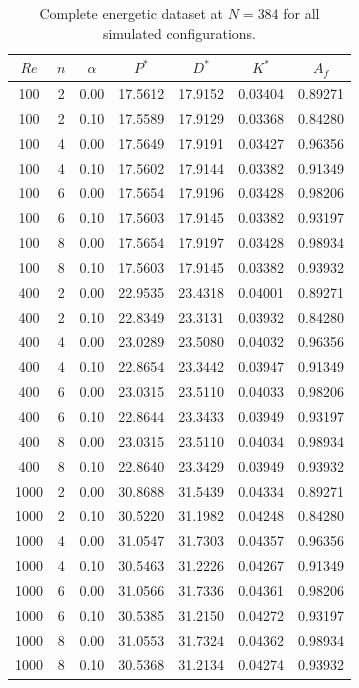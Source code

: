 \begin{table}[!htbp]
\centering
\caption{Complete energetic dataset at $N=384$ for all simulated configurations.}
\label{tab:full_scalars384}
\begin{tabular}{@{}ccccccc@{}}
\hline
$Re$ & $n$ & $\alpha$ & $P^*$ & $D^*$ & $K^*$ & $A_f$ \\
\hline
100 & 2 & 0.00 & 17.5612 & 17.9152 & 0.03404 & 0.89271 \\
100 & 2 & 0.10 & 17.5589 & 17.9129 & 0.03368 & 0.84280 \\
100 & 4 & 0.00 & 17.5649 & 17.9191 & 0.03427 & 0.96356 \\
100 & 4 & 0.10 & 17.5602 & 17.9144 & 0.03382 & 0.91349 \\
100 & 6 & 0.00 & 17.5654 & 17.9196 & 0.03428 & 0.98206 \\
100 & 6 & 0.10 & 17.5603 & 17.9145 & 0.03382 & 0.93197 \\
100 & 8 & 0.00 & 17.5654 & 17.9197 & 0.03428 & 0.98934 \\
100 & 8 & 0.10 & 17.5603 & 17.9145 & 0.03382 & 0.93932 \\
400 & 2 & 0.00 & 22.9535 & 23.4318 & 0.04001 & 0.89271 \\
400 & 2 & 0.10 & 22.8349 & 23.3131 & 0.03932 & 0.84280 \\
400 & 4 & 0.00 & 23.0289 & 23.5080 & 0.04032 & 0.96356 \\
400 & 4 & 0.10 & 22.8654 & 23.3442 & 0.03947 & 0.91349 \\
400 & 6 & 0.00 & 23.0315 & 23.5110 & 0.04033 & 0.98206 \\
400 & 6 & 0.10 & 22.8644 & 23.3433 & 0.03949 & 0.93197 \\
400 & 8 & 0.00 & 23.0315 & 23.5110 & 0.04034 & 0.98934 \\
400 & 8 & 0.10 & 22.8640 & 23.3429 & 0.03949 & 0.93932 \\
1000 & 2 & 0.00 & 30.8688 & 31.5439 & 0.04334 & 0.89271 \\
1000 & 2 & 0.10 & 30.5220 & 31.1982 & 0.04248 & 0.84280 \\
1000 & 4 & 0.00 & 31.0547 & 31.7303 & 0.04357 & 0.96356 \\
1000 & 4 & 0.10 & 30.5463 & 31.2226 & 0.04267 & 0.91349 \\
1000 & 6 & 0.00 & 31.0566 & 31.7336 & 0.04361 & 0.98206 \\
1000 & 6 & 0.10 & 30.5385 & 31.2150 & 0.04272 & 0.93197 \\
1000 & 8 & 0.00 & 31.0553 & 31.7324 & 0.04362 & 0.98934 \\
1000 & 8 & 0.10 & 30.5368 & 31.2134 & 0.04274 & 0.93932 \\
\hline
\end{tabular}
\end{table}
